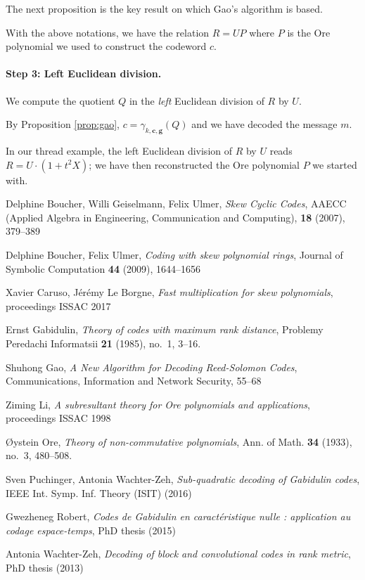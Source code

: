 \documentclass[a4paper]{llncs}
\newcommand{\bc}{\textbf{c}}
\newcommand{\bg}{\textbf{g}}
\begin{document}
The next proposition is the key result on which Gao's algorithm is
based.

\begin{proposition}
\label{prop:gao}
With the above notations, we have the relation $R = UP$
where $P$ is the Ore polynomial we used to construct the codeword 
$c$.
\end{proposition}

\paragraph{Step 3: Left Euclidean division.}
We compute the quotient $Q$ in the \emph{left} Euclidean division 
of $R$ by $U$. 

\noindent
By Proposition \ref{prop:gao}, $c = \gamma_{k,\bc,\bg}(Q)$ and we 
have decoded the message $m$.

{\small
\begin{example}
In our thread example, the left Euclidean division of $R$ by $U$
reads $R = U \cdot (1 + t^2 X)$; we have then reconstructed the
Ore polynomial $P$ we started with.
\end{example}}

\begin{thebibliography}{99}
  Delphine Boucher, Willi Geiselmann, Felix Ulmer,
  \emph{Skew Cyclic Codes},
  AAECC (Applied Algebra in Engineering, Communication and Computing), 
  \textbf{18} (2007), 379--389

  Delphine Boucher, Felix Ulmer,
  \emph{Coding with skew polynomial rings},
  Journal of Symbolic Computation \textbf{44} (2009), 1644--1656

  Xavier Caruso, Jérémy Le Borgne,
  \emph{Fast multiplication for skew polynomials},
  proceedings ISSAC 2017

  Ernst Gabidulin,
  \emph{Theory of codes with maximum rank distance},
  Problemy Peredachi Informatsii \textbf{21} (1985), no.~1, 3--16.

  Shuhong Gao,
  \emph{A New Algorithm for Decoding Reed-Solomon Codes},
  Communications, Information and Network Security, 55--68

  Ziming Li,
  \emph{A subresultant theory for Ore polynomials and applications},
  proceedings ISSAC 1998

  Øystein Ore,
  \emph{Theory of non-commutative polynomials},
  Ann. of Math. \textbf{34} (1933), no.~3, 480--508.

  Sven Puchinger, Antonia Wachter-Zeh,
  \emph{Sub-quadratic decoding of Gabidulin codes}, 
  IEEE Int. Symp. Inf. Theory (ISIT) (2016)

  Gwezheneg Robert,
  \emph{Codes de Gabidulin en caractéristique nulle : application au codage espace-temps},
  PhD thesis (2015)

  Antonia Wachter-Zeh,
  \emph{Decoding of block and convolutional codes in rank metric},
  PhD thesis (2013)

\end{thebibliography}
\end{document}
